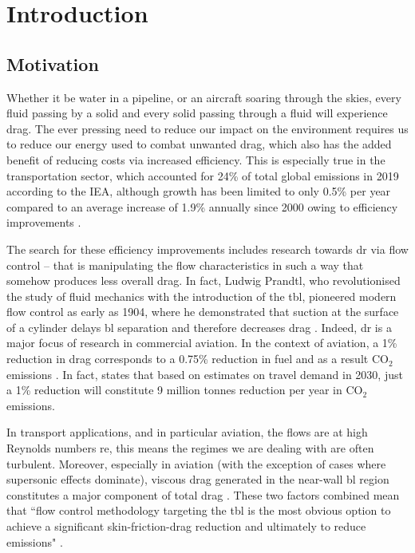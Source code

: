 \chapter{Introduction}
\section{Motivation}\label{sec:motivation}
Whether it be water in a pipeline, or an aircraft soaring through the skies, every fluid passing by a solid and every solid passing through a fluid will experience drag. The ever pressing need to reduce our impact on the environment requires us to reduce our energy used to combat unwanted drag, which also has the added benefit of reducing costs via increased efficiency. This is especially true in the transportation sector, which accounted for 24\% of total global emissions in 2019 according to the IEA, although growth has been limited to only 0.5\% per year compared to an average increase of 1.9\% annually since 2000 owing to efficiency improvements \cite{iea2021}.

The search for these efficiency improvements includes research towards \gls*{dr} via flow control -- that is manipulating the flow characteristics in such a way that somehow produces less overall drag. In fact, Ludwig Prandtl, who revolutionised the study of fluid mechanics with the introduction of the \gls*{tbl}, pioneered modern flow control as early as 1904, where he demonstrated that suction at the surface of a cylinder delays \gls*{bl} separation and therefore decreases drag \cite{gad-el-hak2001,prandtl1904}. Indeed, \gls*{dr} is a major focus of research in commercial aviation. In the context of aviation, a 1\% reduction in drag corresponds to a 0.75\% reduction in fuel and as a result \ensuremath{\mathrm{CO_2}} emissions \cite{leschziner2011}. In fact, \textcite{leschziner2011} states that based on estimates on travel demand in 2030, just a 1\% reduction will constitute 9 million tonnes reduction per year in \ensuremath{\mathrm{CO_2}} emissions.

In transport applications, and in particular aviation, the flows are at high Reynolds numbers \gls*{re}, this means the regimes we are dealing with are often turbulent. Moreover, especially in aviation (with the exception of cases where supersonic effects dominate), viscous drag generated in the near-wall \gls*{bl} region constitutes a major component of total drag \cite{abbas2017}. These two factors combined mean that ``flow control methodology targeting the \gls*{tbl} is the most obvious option to achieve a significant skin-friction-drag reduction and ultimately to reduce emissions" \cite{abbas2017}.

